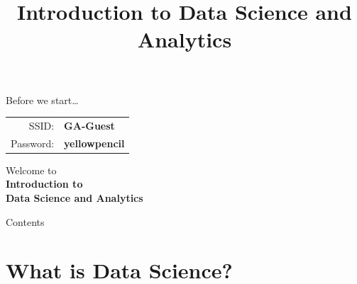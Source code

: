 

\title{Introduction to Data Science and Analytics}



\maketitle

\begin{frame}{Before we start\ldots}
    \begin{center}
        \LARGE%
        \begin{tabular}{rl}
            SSID:     & \textbf{GA-Guest} \\
            Password: & \textbf{yellowpencil}
        \end{tabular}
    \end{center}
\end{frame}

\begin{frame}
    \begin{center}
        \LARGE%
        Welcome to \\[\medskipamount]
        \textbf{Introduction to} \\[\medskipamount]
        \textbf{Data Science and Analytics}
    \end{center}
\end{frame}

\begin{frame}{Contents}
    \tableofcontents[hideallsubsections]
\end{frame}

\section{What is Data Science?}

